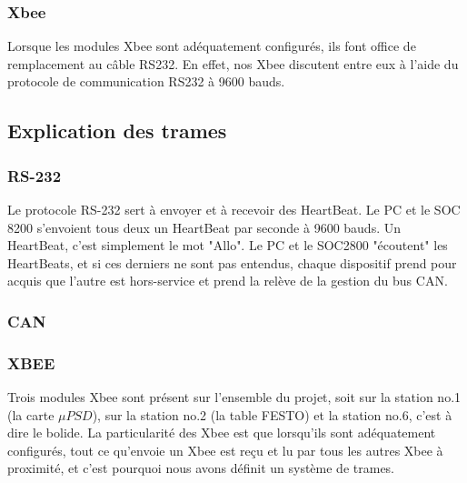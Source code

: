\documentclass[10pt,a4paper,final]{article}
\begin{document}
\begin{spacing}{1.5}
\subsubsection{Xbee}
Lorsque les modules Xbee sont adéquatement configurés, ils font office de remplacement au câble RS232. En effet, nos Xbee discutent entre eux à l'aide du protocole de communication RS232 à 9600 bauds.  


\subsection{Explication des trames}
\subsubsection{RS-232}
Le protocole RS-232 sert à envoyer et à recevoir des HeartBeat. Le PC et le SOC 8200 s'envoient tous deux un HeartBeat par seconde à 9600 bauds. Un HeartBeat, c'est simplement le mot "Allo". Le PC et le SOC2800 "écoutent" les HeartBeats, et si ces derniers ne sont pas entendus, chaque dispositif prend pour acquis que l'autre est hors-service et prend la relève de la gestion du bus CAN.

\subsubsection{CAN}

\subsubsection{XBEE}
Trois modules Xbee sont présent sur l'ensemble du projet, soit sur la station no.1 (la carte $\mu PSD$), sur la station no.2 (la table FESTO) et la station no.6, c'est à dire le bolide. La particularité des Xbee est que lorsqu'ils sont adéquatement configurés, tout ce qu'envoie un Xbee est reçu et lu par tous les autres Xbee à proximité, et c'est pourquoi nous avons définit un système de trames.




\end{spacing}
\end{document}
